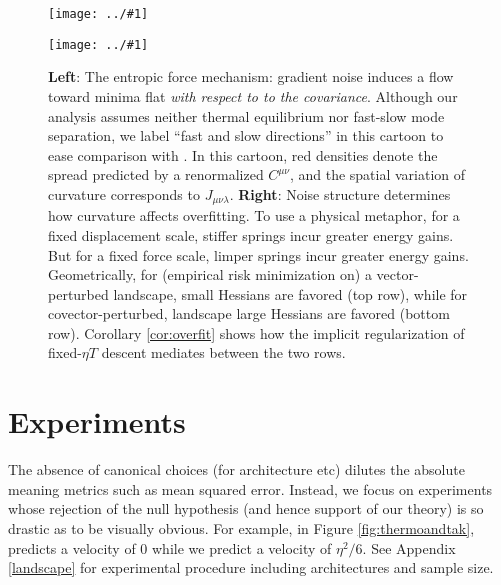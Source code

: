 \documentclass{article}
\theoremstyle{plain}
\theoremstyle{definition}
\newcommand{\plotmooh}[3]{
    \texttt{[image: ../\#1]}
}
\begin{document}
        \begin{figure}[h!]
            \centering
            \plotmooh{diagrams/entropic-force-diagram}{}{0.35\columnwidth} 
            \plotmooh{diagrams/springs}{}{0.35\columnwidth}
            \caption{
                {\bf Left}:
                    The entropic force mechanism: gradient noise induces a flow
                    toward minima flat \emph{with respect to to the
                    covariance}.  Although our analysis assumes neither thermal
                    equilibrium nor fast-slow mode separation, we label ``fast
                    and slow directions'' in this cartoon to ease comparison
                    with \citet{we19b}.  In this cartoon, red densities denote
                    the spread predicted by a renormalized $C^{\mu\nu}$, and
                    the spatial variation of curvature corresponds to
                    $J_{\mu\nu\lambda}$. 
                {\bf Right}:
                    Noise structure determines how curvature affects
                    overfitting.  To use a physical metaphor, for a fixed
                    displacement scale, stiffer springs incur greater energy
                    gains.  But for a fixed force scale, limper springs incur
                    greater energy gains.  Geometrically, for (empirical risk
                    minimization on) a vector-perturbed landscape, small
                    Hessians are favored (top row), while for
                    covector-perturbed, landscape large Hessians are favored
                    (bottom row).  Corollary \ref{cor:overfit} shows how the
                    implicit regularization of fixed-$\eta T$ descent mediates
                    between the two rows.
            }
            \label{fig:cubicandspring}
        \end{figure}


\section{Experiments}

    The absence of canonical choices (for architecture etc) dilutes the
    absolute meaning metrics  such as mean squared error.  Instead, we focus on
    experiments whose rejection of the null hypothesis (and hence support of
    our theory) is so drastic as to be visually obvious.  For example, in
    Figure \ref{fig:thermoandtak}, \citep{ch18} predicts a velocity of $0$
    while we predict a velocity of $\eta^2/6$.  See Appendix \ref{landscape}
    for experimental procedure including architectures and sample size.
\end{document}
